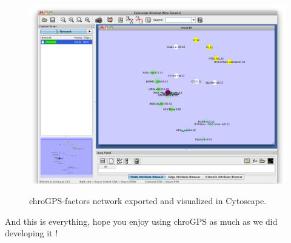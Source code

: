 \documentclass[a4paper,12pt,nogin]{article}
\begin{document}
\begin{figure}
\begin{center}
{\includegraphics{chroGPS-cyto.png}}
\end{center}
\caption{chroGPS-factors network exported and visualized in Cytoscape. }
\label{fig:profile1}
\end{figure}

\normalsize

And this is everything, hope you enjoy using chroGPS as much as we did developing it !

%
% 
\end{document}

